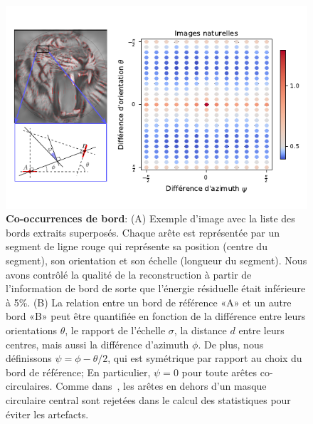 \documentclass[11pt,french,a4paper,oneside]{article}%
\begin{document}
\begin{figure}%
\centerline{%
\includegraphics[width=\linewidth]{figure_synthesis_FR.pdf}
}
\caption{
\textbf{Co-occurrences de bord}: 
 (A) Exemple d'image avec la liste des bords extraits superposés. Chaque arête est représentée par un segment de ligne rouge qui représente sa position (centre du segment), son orientation et son échelle (longueur du segment). Nous avons contrôlé la qualité de la reconstruction à partir de l'information de bord de sorte que l'énergie résiduelle était inférieure à 5\%. (B) La relation entre un bord de référence «A» et un autre bord «B» peut être quantifiée en fonction de la différence entre leurs orientations $\theta $, le rapport de l'échelle $\sigma $, la distance $ d $ entre leurs centres, mais aussi la différence d'azimuth $\phi $. De plus, nous définissons $\psi =\phi -\theta / 2 $, qui est symétrique par rapport au choix du bord de référence; En particulier, $\psi = 0 $ pour toute arêtes co-circulaires. Comme dans~\citet {Geisler01}, les arêtes en dehors d'un masque circulaire central sont rejetées dans le calcul des statistiques pour éviter les artefacts.
%
 }%
\label{fig:PerrinetBednar15}%
\end{figure}%
\end{document}
